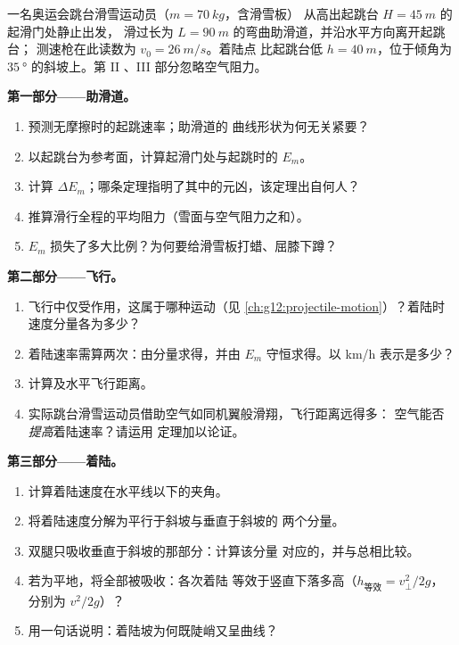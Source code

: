 \begin{problem}
\label{pb:g12:work-and-energy:1}
一名奥运会跳台滑雪运动员（$m = \qty{70}{kg}$，含滑雪板）
从高出起跳台 $H = \qty{45}{m}$ 的起滑门处静止出发，
滑过长为 $L = \qty{90}{m}$ 的弯曲助滑道，并沿水平方向离开起跳台；
测速枪在此读数为 $v_0 = \qty{26}{m/s}$。着陆点
比起跳台低 $h = \qty{40}{m}$，位于倾角为 $\qty{35}{\degree}$ 的斜坡上。第 II
、III 部分忽略空气阻力。

\medskip\noindent\textbf{第一部分——助滑道。}
\begin{enumerate}
  \item 预测无摩擦时的起跳速率；助滑道的
        曲线形状为何无关紧要？
  \item 以起跳台为参考面，计算起滑门处与起跳时的 $E_m$。
  \item 计算 $\Delta E_m$；哪条定理指明了其中的元凶，该定理出自何人？
  \item 推算滑行全程的平均阻力（雪面与空气阻力之和）。
  \item $E_m$ 损失了多大比例？为何要给滑雪板打蜡、屈膝下蹲？
\end{enumerate}

\medskip\noindent\textbf{第二部分——飞行。}
\begin{enumerate}[resume]
  \item 飞行中仅受作用，这属于哪种运动（见
        \cref{ch:g12:projectile-motion}）？着陆时
        速度分量各为多少？
  \item 着陆速率需算两次：由分量求得，并由 $E_m$
        守恒求得。以 \unit{km/h} 表示是多少？
  \item 计算及水平飞行距离。
  \item 实际跳台滑雪运动员借助空气如同机翼般滑翔，飞行距离远得多：
        空气能否\emph{提高}着陆速率？请运用
        定理加以论证。
\end{enumerate}

\medskip\noindent\textbf{第三部分——着陆。}
\begin{enumerate}[resume]
  \item 计算着陆速度在水平线以下的夹角。
  \item 将着陆速度分解为平行于斜坡与垂直于斜坡的
        两个分量。
  \item 双腿只吸收垂直于斜坡的那部分：计算该分量
        对应的，并与总相比较。
  \item 若为平地，将全部被吸收：各次着陆
        等效于竖直下落多高（$h_{\text{等效}} = v_\perp^2/2g$，
        分别为 $v^2/2g$）？
  \item 用一句话说明：着陆坡为何既陡峭又呈曲线？
\end{enumerate}


\end{problem}
